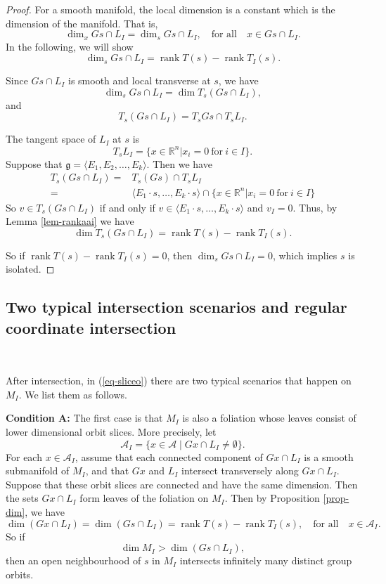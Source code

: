 \documentclass[reqno]{amsart}
\theoremstyle{definition}
\numberwithin{equation}{section}
\theoremstyle{remark}
\begin{document}
\begin{proof}
For a smooth manifold, the local dimension is a constant which is the dimension of the manifold. That is, 
$$\dim_x Gs\cap L_I=\dim_s Gs\cap L_I,\quad\text{for all}\quad x\in Gs\cap L_I.$$
In the following, we will show
$$\dim_s Gs\cap L_I=\operatorname{rank}T(s)-\operatorname{rank}T_I(s).$$

Since $Gs\cap L_I$ is smooth and local transverse at $s$, we have 
$$\dim_s Gs\cap L_I=\dim T_s (Gs\cap L_I),$$
and
$$T_s (Gs\cap L_I)=T_s Gs \cap T_s L_I.$$

The tangent space of $L_I$ at $s$ is
$$T_s L_I=\{x\in \mathbb{R}^n|x_i=0~\text{for}~i\in I\}.$$
Suppose that $\mathfrak{g}=\langle E_1, E_2,\ldots, E_k\rangle$. Then we have
\begin{align*}
 T_s (Gs\cap L_I)=&T_s (Gs) \cap T_s L_I \\
      =&\langle E_1\cdot s,\ldots, E_k \cdot s \rangle \cap \{x\in \mathbb{R}^n|x_i=0~\text{for}~i\in I\}
\end{align*}
So $v\in T_s (Gs\cap L_I)$ if and only if $v\in \langle E_1\cdot s,\ldots, E_k \cdot s \rangle$ and $v_I=0$. Thus, by Lemma \ref{lem-rankaai} we have
$$\dim T_s (Gs\cap L_I)=\operatorname{rank}T(s)-\operatorname{rank}T_I(s).$$

So if $\operatorname{rank}T(s)-\operatorname{rank}T_I(s)=0$, then $\dim_s Gs\cap L_I=0$, which implies $s$ is isolated.
\end{proof}

\subsection{Two typical intersection scenarios and  regular coordinate intersection}\label{subsec-two}
\

After intersection, in (\ref{eq-sliceo}) there are two typical scenarios that happen on $M_I$. We list them as follows.

\textbf{Condition A:}
The first case is that $M_I$ is also a foliation whose leaves consist of lower dimensional orbit slices.
More precisely, let
$$\mathcal A_I=\{x\in\mathcal A\mid Gx\cap L_I\neq \emptyset\}.$$
For each $x\in\mathcal A_I$, assume that each connected component of
$Gx\cap L_I$ is a smooth submanifold of $M_I$, and that $Gx$ and $L_I$ intersect transversely along $Gx\cap L_I$. Suppose that these orbit slices are connected and have the same dimension. Then the sets $Gx\cap L_I$ form leaves of the foliation on $M_I$.
Then by Proposition \ref{prop-dim}, we have
$$\dim(Gx\cap L_I)=\dim(Gs\cap L_I)=\operatorname{rank}T(s)-\operatorname{rank}T_I(s),
\quad\text{for all}\quad x\in \mathcal{A}_I.$$
So if 
$$\dim M_I>\dim(Gs\cap L_I),$$
then an open neighbourhood of $s$ in
$M_I$ intersects infinitely many distinct group orbits.
\end{document}
